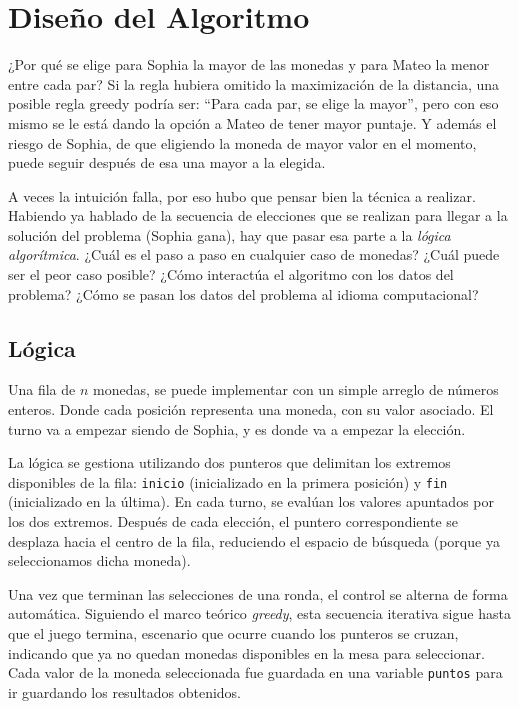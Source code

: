 \section{Diseño del Algoritmo}
¿Por qué se elige para Sophia la mayor de las monedas y para Mateo la menor entre cada par?
Si la regla hubiera omitido la maximización de la distancia, una posible regla greedy podría ser: ``Para cada par, se elige la mayor'', pero con eso mismo se le está dando la opción a Mateo de tener mayor puntaje. Y además el riesgo de Sophia, de que eligiendo la moneda de mayor valor en el momento, puede seguir después de esa una mayor a la elegida.

A veces la intuición falla, por eso hubo que pensar bien la técnica a realizar. Habiendo ya hablado de la secuencia de elecciones que se realizan para llegar a la solución del problema (Sophia gana), hay que pasar esa parte a la \textit{lógica algorítmica}. ¿Cuál es el paso a paso en cualquier caso de monedas? ¿Cuál puede ser el peor caso posible? ¿Cómo interactúa el algoritmo con los datos del problema? ¿Cómo se pasan los datos del problema al idioma computacional?

\subsection{Lógica}

Una fila de $n$ monedas, se puede implementar con un simple arreglo de números enteros. Donde cada posición representa una moneda, con su valor asociado.
El turno va a empezar siendo de Sophia, y es donde va a empezar la elección. 

La lógica se gestiona utilizando dos punteros que delimitan los extremos disponibles de la fila:  \texttt{inicio} (inicializado en la primera posición) y \texttt{fin} (inicializado en la última). En cada turno, se evalúan los valores apuntados por los dos extremos. Después de cada elección, el puntero correspondiente se desplaza hacia el centro de la fila, reduciendo el espacio de búsqueda (porque ya seleccionamos dicha moneda).

Una vez que terminan las selecciones de una ronda, el control se alterna de forma automática. Siguiendo el marco teórico \textit{greedy}, esta secuencia iterativa sigue hasta que el juego termina, escenario que ocurre cuando los punteros se cruzan, indicando que ya no quedan monedas disponibles en la mesa para seleccionar. Cada valor de la moneda seleccionada fue guardada en una variable \texttt{puntos} para ir guardando los resultados obtenidos.





